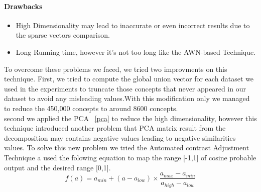\paragraph{Drawbacks}	
\begin{itemize}
\item High Dimensionality may lead to inaccurate or even incorrect results due to the sparse vectors comparison.
\item Long Running time, however it's not too long like the AWN-based Technique. 
\end{itemize}
To overcome these problems we faced, we tried two improvments on this technique. First, we tried to compute the global union vector for each dataset we used in the experiments to truncate those concepts that never appeared in our dataset to avoid any misleading values.With this modification only we managed to reduce the 450,000 concepts to around 8600 concepts.\\
second we applied the PCA ~\ref{pca} to reduce the high dimensionality, however this technique introduced another problem that PCA matrix result from the decomposition may contains negative values leading to negative similarities values.
To solve this new problem we tried the Automated contrast Adjustment Technique \citep{acadjstment} a used the folowing equation to map the range [-1,1] of cosine probable output and the desired range [0,1].
\begin{equation}
f(a) =a_{min}+ (a- a_{low})\times \frac{a_{max}-a_{min}}{a_{high} - a_{low}}
\end{equation}

